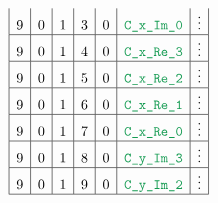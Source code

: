 \begin{figure}[h!]
\begin{adjustwidth}{-2cm}{-2cm}
{\[\begin{array}{|c|c|c|c|c|c|c|}
                    9                      & 0                                       & 1                                         & 3                      & 0                   & \locCXImZero  & \vdots                                                                                                                                                            \\ \hline
                    9                      & 0                                       & 1                                         & 4                      & 0                   & \locCXReThree & \vdots                                                                                                                                                            \\ \hline
                    9                      & 0                                       & 1                                         & 5                      & 0                   & \locCXReTwo   & \vdots                                                                                                                                                            \\ \hline
                    9                      & 0                                       & 1                                         & 6                      & 0                   & \locCXReOne   & \vdots                                                                                                                                                            \\ \hline
                    9                      & 0                                       & 1                                         & 7                      & 0                   & \locCXReZero  & \vdots                                                                                                                                                            \\ \hline
                    9                      & 0                                       & 1                                         & 8                      & 0                   & \locCYImThree & \vdots                                                                                                                                                            \\ \hline
                    9                      & 0                                       & 1                                         & 9                      & 0                   & \locCYImTwo   & \vdots                                                                                                                                                            \\ \hline

\end{array}\]}
\end{adjustwidth}
\end{figure}
